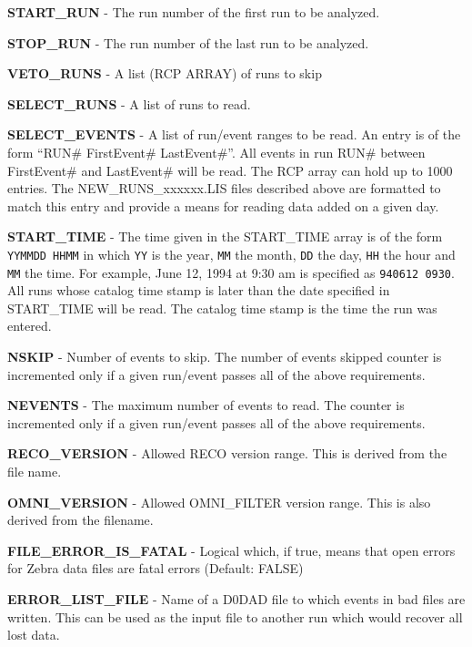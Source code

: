 \begin{table}{\small
  \begin{list}{ }{ in  in }
     \item {\bf START\_RUN} - The run number of the first run to be analyzed.
     \item {\bf STOP\_RUN}  - The run number of the last run to be analyzed.
     \item {\bf VETO\_RUNS} - A list (RCP ARRAY) of runs to skip
     \item {\bf SELECT\_RUNS } - A list of runs to read.
     \item {\bf SELECT\_EVENTS } - A list of run/event ranges to be read. An
       entry is of the form ``RUN\# FirstEvent\# LastEvent\#''.  All events in
       run RUN\# between FirstEvent\# and LastEvent\# will be read.  The
       RCP array can hold up to 1000 entries.  The NEW\_RUNS\_xxxxxx.LIS files
       described above are formatted to match this entry and provide a means
       for reading data added on a given day.
     \item {\bf START\_TIME} - The
       time given in the START\_TIME array is of the form {\tt YYMMDD HHMM} in
       which {\tt YY} is the year, {\tt MM} the month, {\tt DD} the day, 
       {\tt HH} the hour and {\tt MM} the time.  For example, 
       June 12, 1994 at 9:30 am is specified as {\tt 940612 0930}.  All
       runs whose catalog time stamp is later than the date specified in 
       START\_TIME will be read.  The catalog time stamp is the time the run was
       entered.
     \item {\bf NSKIP} - Number of events to skip.  The number of events 
       skipped counter 
       is incremented only if a given run/event passes all of the above 
       requirements.
     \item {\bf NEVENTS} - The maximum number of events to read.  The counter
        is incremented only if a given run/event passes all of the above 
        requirements.
     \item { \bf RECO\_VERSION} - Allowed RECO version range. This is derived
        from the file name.
     \item { \bf OMNI\_VERSION} - Allowed OMNI\_FILTER version range. This
        is also derived from the filename.
     \item { \bf FILE\_ERROR\_IS\_FATAL} - Logical which, if true, means that 
        open errors for Zebra data files are fatal errors (Default: FALSE)
     \item { \bf ERROR\_LIST\_FILE} - Name of a D0DAD file to which events in
        bad files are written.  This can be used as the input file to another
        run which would recover all lost data.
  \end{list}}
  \caption{Definitions of the RCP parameters in D0DAD.RCP \label{t-rcp}}
\end{table}
